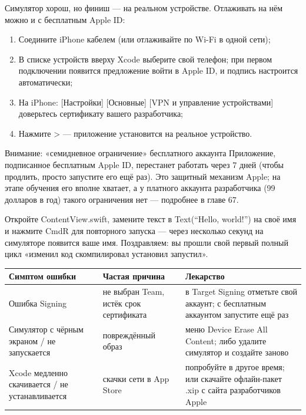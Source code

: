 
Симулятор хорош, но финиш — на реальном устройстве. Отлаживать на нём можно и с бесплатным Apple ID:

\begin{enumerate}
  \item Соедините iPhone кабелем (или отлаживайте по Wi-Fi в одной сети);
  \item В списке устройств вверху Xcode выберите свой телефон; при первом подключении появится предложение войти в Apple ID, и подпись настроится автоматически;
  \item На iPhone: [Настройки] [Основные] [VPN и управление устройствами] доверьтесь сертификату вашего разработчика;
  \item Нажмите > — приложение установится на реальное устройство.
\end{enumerate}

\begin{tcbwarn}{Внимание: «семидневное ограничение» бесплатного аккаунта}
Приложение, подписанное бесплатным Apple ID, перестанет работать через 7 дней (чтобы продлить, просто запустите его ещё раз). Это защитный механизм Apple; на этапе обучения его вполне хватает, а у платного аккаунта разработчика (99 долларов в год) такого ограничения нет — подробнее в главе 67.

\end{tcbwarn}



Откройте ContentView.swift, замените текст в Text(“Hello, world!”) на своё имя и нажмите CmdR для повторного запуска — через несколько секунд на симуляторе появится ваше имя. Поздравляем: вы прошли свой первый полный цикл «изменил код скомпилировал установил запустил».

\begin{center}
\begin{tabularx}{\linewidth}{|X|X|X|}
\hline
\textbf{Симптом ошибки} & \textbf{Частая причина} & \textbf{Лекарство} \tabularnewline
\hline
Ошибка Signing & не выбран Team, истёк срок сертификата & в Target Signing отметьте свой аккаунт; с бесплатным аккаунтом запустите ещё раз \tabularnewline
Симулятор с чёрным экраном / не запускается & повреждённый образ & меню Device Erase All Content; либо удалите симулятор и создайте заново \tabularnewline
Xcode медленно скачивается / не устанавливается & скачки сети в App Store & попробуйте в другое время; или скачайте офлайн-пакет .xip с сайта разработчиков Apple \tabularnewline
\hline
\end{tabularx}
\end{center}

